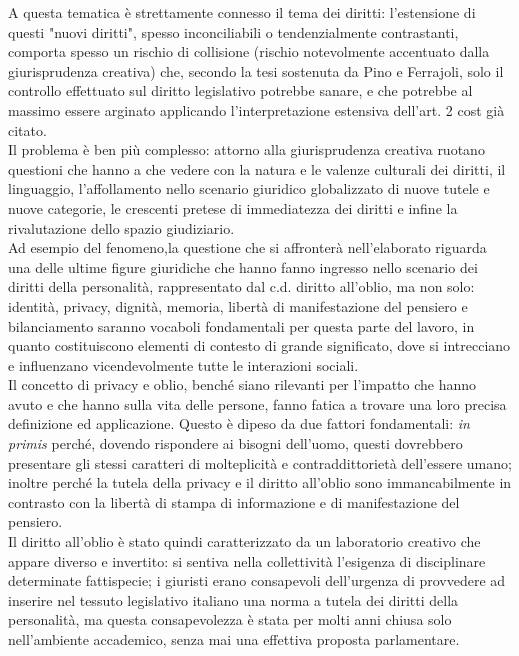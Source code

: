 A questa tematica è strettamente connesso il tema dei diritti: l'estensione di questi "nuovi diritti", spesso inconciliabili o tendenzialmente contrastanti, comporta spesso un rischio di collisione (rischio notevolmente accentuato dalla giurisprudenza creativa) che, secondo la tesi sostenuta da Pino e Ferrajoli, solo il controllo effettuato sul diritto legislativo potrebbe sanare, e che potrebbe al massimo essere arginato applicando l'interpretazione estensiva dell'art. 2 cost già citato.
\\Il problema è ben più complesso: attorno alla giurisprudenza creativa ruotano questioni che hanno a che vedere con la natura e le valenze culturali dei diritti, il linguaggio, l'affollamento nello scenario giuridico globalizzato di nuove tutele e nuove categorie, le crescenti pretese di immediatezza dei diritti e infine la rivalutazione dello spazio giudiziario. 
\\Ad esempio del fenomeno,la questione che si affronterà nell'elaborato riguarda una delle ultime figure giuridiche che hanno fanno ingresso nello scenario dei diritti della personalità, rappresentato dal c.d. diritto all'oblio, ma non solo: identità, privacy, dignità, memoria, libertà di manifestazione del pensiero e bilanciamento saranno vocaboli fondamentali per questa parte del lavoro, in quanto costituiscono elementi di contesto di grande significato, dove si intrecciano e influenzano vicendevolmente tutte le interazioni sociali.
\\Il concetto di privacy e oblio, benché siano rilevanti per l'impatto che hanno avuto e che hanno sulla vita delle persone, fanno fatica a trovare una loro precisa definizione ed applicazione. Questo è dipeso da due fattori fondamentali: \textit{in primis} perché, dovendo rispondere ai bisogni dell'uomo, questi dovrebbero presentare gli stessi caratteri di molteplicità e contraddittorietà dell'essere umano; inoltre perché la tutela della privacy e il diritto all'oblio sono immancabilmente in contrasto con la libertà di stampa di informazione e di manifestazione del pensiero.
\\Il diritto all'oblio è stato quindi caratterizzato da un laboratorio creativo che appare diverso e invertito: si sentiva nella collettività l'esigenza di disciplinare determinate fattispecie; i giuristi erano consapevoli dell'urgenza di provvedere ad inserire nel tessuto legislativo italiano una norma a tutela dei diritti della personalità, ma questa consapevolezza è stata per molti anni chiusa solo nell'ambiente accademico, senza mai una effettiva proposta parlamentare.
